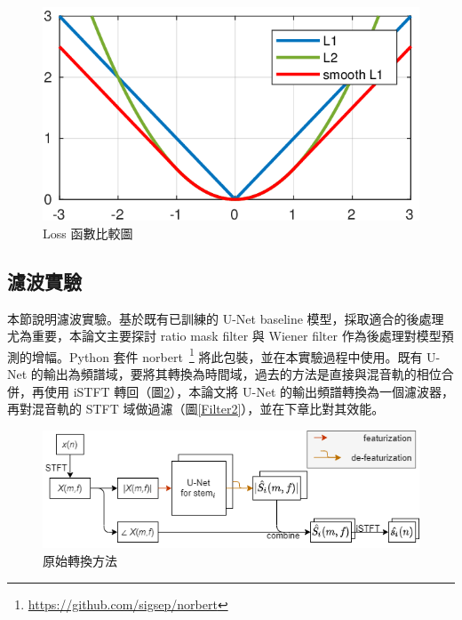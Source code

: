 \begin{figure}[htbp]
    \hfil
    \begin{minipage}[t]{0.6\textwidth}
        \includegraphics[width=\textwidth]{./figures/chapter04_experiment/xLxLoss1.png}
        \caption {Loss 函數比較圖}
        \label{xLxLoss1}
    \end{minipage}
    \hfil
\end{figure}

\subsection{濾波實驗}
本節說明濾波實驗。基於既有已訓練的 U-Net baseline 模型，採取適合的後處理尤為重要，本論文主要探討 ratio mask filter 與 Wiener filter 作為後處理對模型預測的增幅。Python 套件 norbert~\cite{liutkus2019sigsep}\footnote{\url{https://github.com/sigsep/norbert}} 將此包裝，並在本實驗過程中使用。既有 U-Net 的輸出為頻譜域，要將其轉換為時間域，過去的方法是直接與混音軌的相位合併，再使用 iSTFT 轉回（圖\ref{Filter1}），本論文將 U-Net 的輸出頻譜轉換為一個濾波器，再對混音軌的 STFT 域做過濾（圖\ref{Filter2}），並在下章比對其效能。

\begin{figure}[htbp]
    \hfil
    \begin{minipage}[t]{0.8\textwidth}
        \includegraphics[width=\textwidth]{./figures/chapter04_experiment/Filter1.png}
        \caption {原始轉換方法}
        \label{Filter1}
    \end{minipage}
    \hfil
\end{figure}

